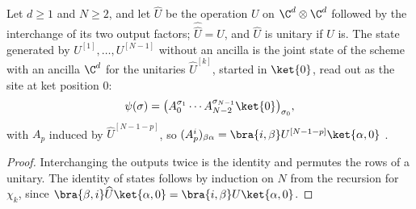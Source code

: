 \begin{lemma}
    \label{thm:seqanc_no_ancilla_joint}
    \leanok
    Let $d\ge 1$ and $N\ge 2$, and let $\widehat U$ be the operation $U$ on
    $\C^d\otimes\C^d$ followed by the interchange of its two output factors;
    $\widehat{\widehat U}=U$, and $\widehat U$ is unitary if $U$ is. The state
    generated by $U^{[1]},\dots,U^{[N-1]}$ without an ancilla is the joint
    state of the scheme with an ancilla $\C^d$ for the unitaries
    $\widehat U^{[k]}$, started in $\ket{0}$, read out as the site at ket
    position $0$:
    \begin{align*}
        \psi(\sigma)=\bigl(A_0^{\sigma_1}\cdots A_{N-2}^{\sigma_{N-1}}\ket{0}
        \bigr)_{\sigma_0},
    \end{align*}
    with $A_p$ induced by $\widehat U^{[N-1-p]}$, so
    $(A_p^i)_{\beta\alpha}=\bra{i,\beta}U^{[N-1-p]}\ket{\alpha,0}$
    \cite[Section~5.2]{PerezGarcia2007Matrix}.
\end{lemma}
\begin{proof}
    \leanok
    Interchanging the outputs twice is the identity and permutes the rows of a
    unitary. The identity of states follows by induction on $N$ from the
    recursion for $\chi_k$, since $\bra{\beta,i}\widehat U\ket{\alpha,0}
        =\bra{i,\beta}U\ket{\alpha,0}$.
\end{proof}

